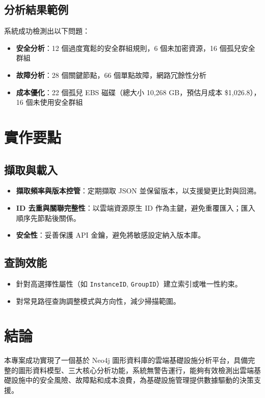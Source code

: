 \documentclass[11pt,a4paper]{ctexart}
\begin{document}
\subsection{分析結果範例}
系統成功檢測出以下問題：
\begin{itemize}[leftmargin=1.5em]
    \item \textbf{安全分析}：12 個過度寬鬆的安全群組規則，6 個未加密資源，16 個孤兒安全群組
    \item \textbf{故障分析}：28 個關鍵節點，66 個單點故障，網路冗餘性分析
    \item \textbf{成本優化}：22 個孤兒 EBS 磁碟（總大小 10,268 GB，預估月成本 \$1,026.8），16 個未使用安全群組
\end{itemize}

\section{實作要點}
\subsection{擷取與載入}
\begin{itemize}[leftmargin=1.5em]
    \item \textbf{擷取頻率與版本控管}：定期擷取 JSON 並保留版本，以支援變更比對與回溯。
    \item \textbf{ID 去重與關聯完整性}：以雲端資源原生 ID 作為主鍵，避免重覆匯入；匯入順序先節點後關係。
    \item \textbf{安全性}：妥善保護 API 金鑰，避免將敏感設定納入版本庫。
\end{itemize}

\subsection{查詢效能}
\begin{itemize}[leftmargin=1.5em]
    \item 針對高選擇性屬性（如 \texttt{InstanceID}, \texttt{GroupID}）建立索引或唯一性約束。
    \item 對常見路徑查詢調整模式與方向性，減少掃描範圍。
\end{itemize}

\section{結論}
本專案成功實現了一個基於 Neo4j 圖形資料庫的雲端基礎設施分析平台，具備完整的圖形資料模型、三大核心分析功能，系統無警告運行，能夠有效檢測出雲端基礎設施中的安全風險、故障點和成本浪費，為基礎設施管理提供數據驅動的決策支援。
\end{document}
